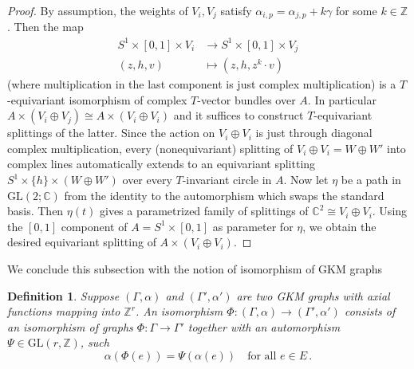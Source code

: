 \documentclass[12pt,a4paper]{amsart}
\newcommand{\GL}{\mathrm{GL}}
\newcommand{\CC}{\mathbb{C}}
\newcommand{\ZZ}{\mathbb{Z}}
\theoremstyle{plain}
\newtheorem{defn}[thm]{Definition}
\theoremstyle{definition}
\begin{document}
\begin{proof}
By assumption, the weights of $V_i,V_j$ satisfy $\alpha_{i,p} = \alpha_{j,p}+k\gamma$ for some $k\in \ZZ$. Then the map
\begin{align*}
S^1\times [0,1]\times V_i&\rightarrow S^1\times [0,1]\times V_j\\
(z,h,v)&\mapsto (z,h, z^{k}\cdot v)
\end{align*}
(where multiplication in the last component is just complex multiplication) is a
$T$-equivariant isomorphism of complex $T$-vector bundles over $A$. In particular $A\times
(V_i\oplus V_j)\cong A\times (V_i\oplus V_i)$ and it suffices to construct $T$-equivariant
splittings of the latter. Since the action on $V_i\oplus V_i$ is just through diagonal
complex multiplication, every (nonequivariant) splitting of $V_i\oplus V_i=W\oplus W'$
into complex lines automatically extends to an equivariant splitting $S^1\times
\{h\}\times (W\oplus W')$ over every $T$-invariant circle in $A$. Now let $\eta$ be a path
in $\GL(2;\CC)$ from the identity to the automorphism which swaps the standard basis. Then
$\eta(t)$ gives a parametrized family of splittings of $\CC^2\cong V_i\oplus V_i$. Using
the $[0,1]$ component of $A=S^1\times [0,1]$ as parameter for $\eta$, we obtain the
desired equivariant splitting of $A\times (V_i\oplus V_i)$.


\end{proof}




We conclude this subsection with the notion of isomorphism of GKM graphs

\begin{defn}\label{D: Iso of GKM graphs}
Suppose $(\Gamma, \alpha)$ and $(\Gamma', \alpha')$ are two GKM graphs with axial
functions mapping into $\mathbb{Z}^{r}$. An \emph{isomorphism}
$\Phi \colon (\Gamma, \alpha) \to (\Gamma', \alpha')$ consists of an isomorphism of graphs
$\Phi \colon \Gamma \to \Gamma'$ together with an automorphism $\Psi \in \mathrm{GL}(r,
\mathbb{Z})$, such 
\[
	\alpha(\Phi(e)) = \Psi(\alpha(e)) \quad \text{for all } e\in E\,.
\]
\end{defn}
\end{document}
